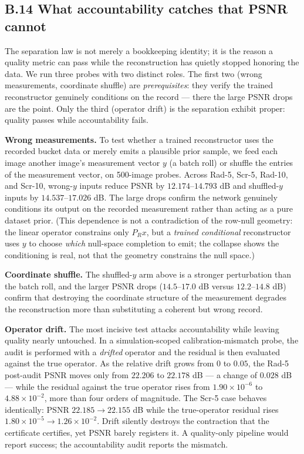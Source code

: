 \documentclass[11pt]{article}
\begin{document}
\subsection*{B.14 What accountability catches that PSNR cannot}

The separation law is not merely a bookkeeping identity; it is the reason a quality metric can pass while the reconstruction has quietly stopped honoring the data. We run three probes with two distinct roles. The first two (wrong measurements, coordinate shuffle) are \textit{prerequisites}: they verify the trained reconstructor genuinely conditions on the record --- there the large PSNR drops are the point. Only the third (operator drift) is the separation exhibit proper: quality passes while accountability fails.

\textbf{Wrong measurements.} To test whether a trained reconstructor uses the recorded bucket data or merely emits a plausible prior sample, we feed each image another image's measurement vector $y$ (a batch roll) or shuffle the entries of the measurement vector, on 500-image probes. Across Rad-5, Scr-5, Rad-10, and Scr-10, wrong-$y$ inputs reduce PSNR by $12.174$--$14.793$ dB and shuffled-$y$ inputs by $14.537$--$17.026$ dB. The large drops confirm the network genuinely conditions its output on the recorded measurement rather than acting as a pure dataset prior. (This dependence is not a contradiction of the row-null geometry: the linear operator constrains only $P_R x$, but a \textit{trained conditional} reconstructor uses $y$ to choose \textit{which} null-space completion to emit; the collapse shows the conditioning is real, not that the geometry constrains the null space.)

\textbf{Coordinate shuffle.} The shuffled-$y$ arm above is a stronger perturbation than the batch roll, and the larger PSNR drops ($14.5$--$17.0$ dB versus $12.2$--$14.8$ dB) confirm that destroying the coordinate structure of the measurement degrades the reconstruction more than substituting a coherent but wrong record.

\textbf{Operator drift.} The most incisive test attacks accountability while leaving quality nearly untouched. In a simulation-scoped calibration-mismatch probe, the audit is performed with a \textit{drifted} operator and the residual is then evaluated against the true operator. As the relative drift grows from $0$ to $0.05$, the Rad-5 post-audit PSNR moves only from $22.206$ to $22.178$ dB --- a change of $0.028$ dB --- while the residual against the true operator rises from $1.90\times10^{-6}$ to $4.88\times10^{-2}$, more than four orders of magnitude. The Scr-5 case behaves identically: PSNR $22.185 \to 22.155$ dB while the true-operator residual rises $1.80\times10^{-5} \to 1.26\times10^{-2}$. Drift silently destroys the contraction that the certificate certifies, yet PSNR barely registers it. A quality-only pipeline would report success; the accountability audit reports the mismatch.
\end{document}
